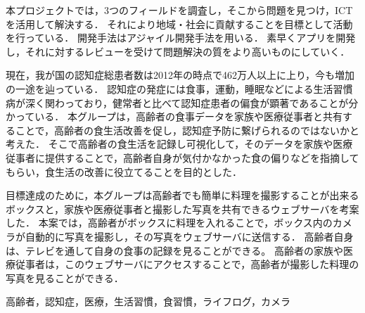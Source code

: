 \documentclass[../report]{subfiles}
\begin{document}
\begin{jabstract}
本プロジェクトでは，3つのフィールドを調査し，そこから問題を見つけ，ICTを活用して解決する．
それにより地域・社会に貢献することを目標として活動を行っている．
開発手法はアジャイル開発手法を用いる．
素早くアプリを開発し，それに対するレビューを受けて問題解決の質をより高いものにしていく．

現在，我が国の認知症総患者数は2012年の時点で462万人以上に上り，今も増加の一途を辿っている．
認知症の発症には食事，運動，睡眠などによる生活習慣病が深く関わっており，健常者と比べて認知症患者の偏食が顕著であることが分かっている．
本グループは，高齢者の食事データを家族や医療従事者と共有することで，高齢者の食生活改善を促し，認知症予防に繋げられるのではないかと考えた．
そこで高齢者の食生活を記録し可視化して，そのデータを家族や医療従事者に提供することで，高齢者自身が気付かなかった食の偏りなどを指摘してもらい，食生活の改善に役立てることを目的とした．

目標達成のために，本グループは高齢者でも簡単に料理を撮影することが出来るボックスと，家族や医療従事者と撮影した写真を共有できるウェブサーバを考案した．
本案では，高齢者がボックスに料理を入れることで，ボックス内のカメラが自動的に写真を撮影し，その写真をウェブサーバに送信する．
高齢者自身は、テレビを通して自身の食事の記録を見ることができる。
高齢者の家族や医療従事者は，このウェブサーバにアクセスすることで，高齢者が撮影した料理の写真を見ることができる．
\begin{jkeyword}
高齢者，認知症，医療，生活習慣，食習慣，ライフログ，カメラ
\end{jkeyword}
\end{jabstract}
\end{document}
